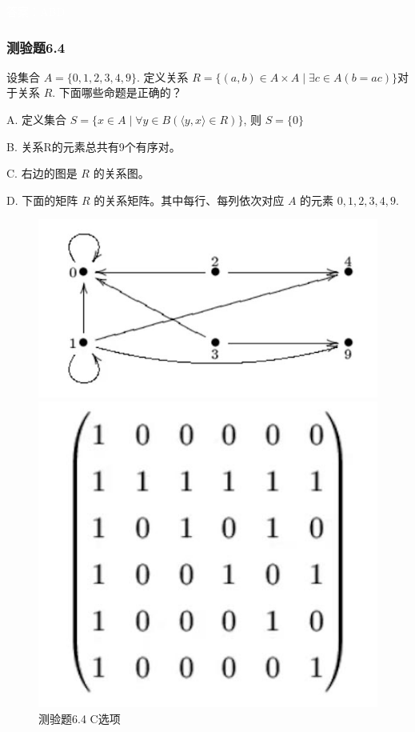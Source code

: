 \documentclass[UTF8, heading=true]{ctexart}
\begin{document}
\textcolor{white}{答案：ABD}


\subsubsection{测验题6.4}
设集合 $A=\{0,1,2,3,4,9\}$. 定义关系 $R=\{(a, b) \in A \times A \mid \exists c \in A(b=a c)\}$对于关系 $R$. 下面哪些命题是正确的？

A. 定义集合 $S=\{x \in A \mid \forall y \in B(\langle y, x\rangle \in R)\}$, 则 $S=\{0\}$

B. 
关系R的元素总共有9个有序对。

C. 
右边的图是 $R$ 的关系图。

D. 
下面的矩阵 $R$ 的关系矩阵。其中每行、每列依次对应 $A$ 的元素 $0,1,2,3,4,9$.

\begin{figure}[H]
    \centering
    \begin{minipage}[t]{0.45\textwidth}
        \centering
        \includegraphics[width=1\textwidth]{6.4_1.jpg} %
	      \vspace{-0.5cm}
        \caption{测验题6.4 C选项}
    \end{minipage}
	  \hspace{0.1\textwidth} %
    \begin{minipage}[t]{0.3\textwidth}
        \centering
        \includegraphics[width=1\textwidth]{6.4_2.jpg} %

\end{minipage}
\end{figure}
\end{document}
